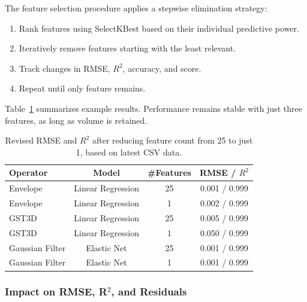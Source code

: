 The feature selection procedure applies a stepwise elimination strategy:

\begin{enumerate}
    \item Rank features using SelectKBest based on their individual predictive power.
    \item Iteratively remove features starting with the least relevant.
    \item Track changes in \ac{RMSE}, $R^2$, accuracy, and score.
    \item Repeat until only feature remains.
\end{enumerate}

Table~\ref{tab:feature_selection_minimal_impact} summarizes example results.
Performance remains stable with just three features, as long as volume is retained.

\begin{table}[htbp]
    \centering
    \begin{tabular}{lccc}
        \hline
        \textbf{Operator} & \textbf{Model}    & \textbf{\#Features} & \textbf{\ac{RMSE} / $R^2$} \\
        \hline
        Envelope          & Linear Regression & 25                  & 0.001 / 0.999              \\
        Envelope          & Linear Regression & 1                   & 0.002 / 0.999              \\
        \ac{GST3D}        & Linear Regression & 25                  & 0.005 / 0.999              \\
        \ac{GST3D}        & Linear Regression & 1                   & 0.050 / 0.999              \\
        Gaussian Filter   & Elastic Net       & 25                  & 0.001 / 0.999              \\
        Gaussian Filter   & Elastic Net       & 1                   & 0.001 / 0.999              \\
        \hline
    \end{tabular}
    \caption{Revised RMSE and $R^2$ after reducing feature count from 25 to just 1, based on latest CSV data.}
    \label{tab:feature_selection_minimal_impact}
\end{table}

\subsubsection{Impact on RMSE, R\texorpdfstring{$^2$}{2}, and Residuals}
\label{subsec:impact-on-rmse-r2-and-residuals}

